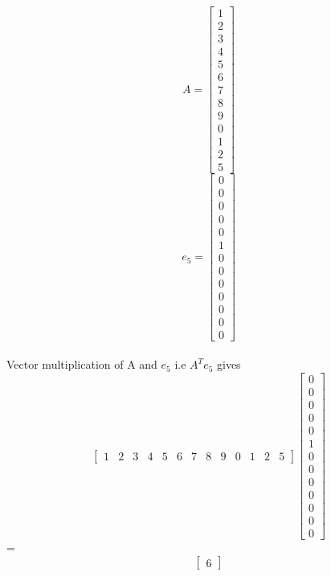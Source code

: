 \documentclass[journal,12pt,twocolumn]{IEEEtran}
\begin{document}
\[
	A = 
	\begin{bmatrix}
		1 
		\\
		2
		\\
		3
		\\
		4
		\\
		5
		\\
		6
		\\
		7
		\\
		8
		\\
		9
		\\
		0
		\\
		1
		\\
		2
		\\
		5
	\end{bmatrix}
\]
$$
	e_{5} = 
	\begin{bmatrix}
		0
		\\
		0
		\\
		0
		\\
		0
		\\
		0
		\\
		1
		\\
		0
		\\
		0
		\\
		0
		\\
		0
		\\
		0
		\\
		0
		\\
		0
	\end{bmatrix}
$$
\\
Vector multiplication of A and $e_{5}$ i.e $A^{T}e_{5}$ gives \\
\[
	\begin{bmatrix}
		1 & 2 & 3 & 4 & 5 & 6 & 7 & 8 & 9 & 0 & 1 & 2 & 5
	\end{bmatrix}
	\begin{bmatrix}
		0
		\\
		0
		\\
		0
		\\
		0
		\\
		0
		\\
		1
		\\
		0
		\\
		0
		\\
		0
		\\
		0
		\\
		0
		\\
		0
		\\
		0
	\end{bmatrix}
\]
=
\[
	\begin{bmatrix}
	6 
	\end{bmatrix}
\]
\end{document}
